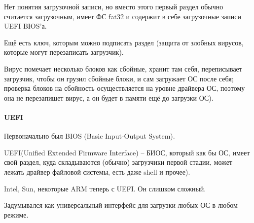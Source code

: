 \documentclass[a4paper,10pt]{article}
\begin{document}
Нет понятия загрузочной записи, но вместо этого первый раздел обычно считается загрузочным, имеет ФС fat32 и содержит в себе загрузочные записи UEFI BIOS'а.

Ещё есть ключ, которым можно подписать раздел (защита от злобных вирусов, которые могут перезаписать загрузчик).

Вирус помечает несколько блоков как сбойные, хранит там себя, переписывает загрузчик, чтобы он грузил сбойные блоки, и сам загружает ОС после себя; проверка блоков на сбойность осуществляется на уровне драйвера ОС, поэтому она не перезапишет вирус, а он будет в памяти ещё до загрузки ОС).

\paragraph{UEFI}
Первоначально был BIOS (Basic Input-Output System).

UEFI(Unified Extended Firmware Interface) -- БИОС, который как бы ОС, имеет свой раздел, куда складываются (обычно) загрузчики первой стадии, может лежать драйвер файловой системы, есть даже shell и прочее).

Intel, Sun, некоторые ARM теперь с UEFI. Он слишком сложный.

Задумывался как универсальный интерфейс для загрузки любых ОС в любом режиме.
\end{document}
